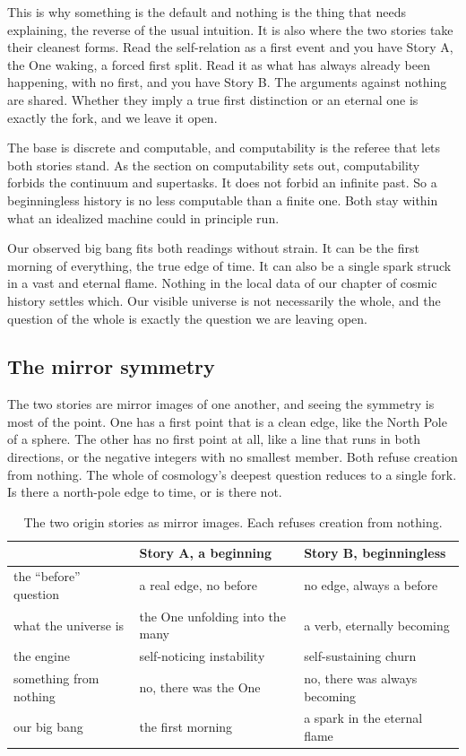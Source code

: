 This is why something is the default and nothing is the thing that needs explaining, the reverse of the usual
intuition. It is also where the two stories take their cleanest forms. Read the self-relation as a first event and
you have Story A, the One waking, a forced first split. Read it as what has always already been happening, with no
first, and you have Story B. The arguments against nothing are shared. Whether they imply a true first distinction
or an eternal one is exactly the fork, and we leave it open.

The base is discrete and computable, and computability is the referee that lets both stories stand. As the section on computability
sets out, computability forbids the continuum and supertasks. It does not forbid an infinite past. So a
beginningless history is no less computable than a finite one. Both stay within what an idealized machine could in
principle run.

Our observed big bang fits both readings without strain. It can be the first morning of everything, the true
edge of time. It can also be a single spark struck in a vast and eternal flame. Nothing in the local data of our
chapter of cosmic history settles which. Our visible universe is not necessarily the whole, and the question of
the whole is exactly the question we are leaving open.

\subsection{The mirror symmetry}

The two stories are mirror images of one another, and seeing the symmetry is most of the point. One has a first
point that is a clean edge, like the North Pole of a sphere. The other has no first point at all, like a line that
runs in both directions, or the negative integers with no smallest member. Both refuse creation from nothing. The
whole of cosmology's deepest question reduces to a single fork. Is there a north-pole edge to time, or is there
not.

\begin{table}[ht]
\centering
\begin{tabular}{@{}lll@{}}
\toprule
 & Story A, a beginning & Story B, beginningless \\
\midrule
the ``before'' question & a real edge, no before & no edge, always a before \\
what the universe is & the One unfolding into the many & a verb, eternally becoming \\
the engine & self-noticing instability & self-sustaining churn \\
something from nothing & no, there was the One & no, there was always becoming \\
our big bang & the first morning & a spark in the eternal flame \\
\bottomrule
\end{tabular}
\caption{The two origin stories as mirror images. Each refuses creation from nothing.}
\end{table}

